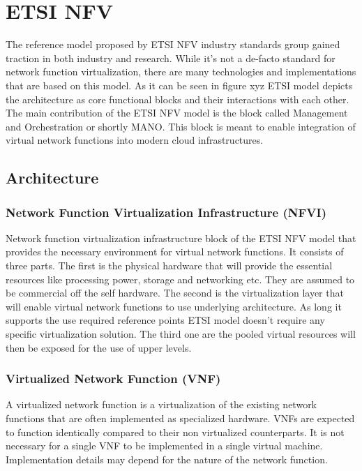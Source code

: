 \documentclass[12pt,oneandhalf,chaparabic,ceng,ms,eng,oneside,pntc]{gsufbe}
\begin{document}
\section{ETSI NFV}
The reference model proposed by ETSI NFV industry standards group gained traction in both industry and
research. While it's not a de-facto standard for network function virtualization, there are many
technologies and implementations that are based on this model. As it can be seen in figure xyz ETSI 
model depicts the architecture as core functional blocks and their interactions with each other. 
The main contribution of the ETSI NFV model is the block called Management and Orchestration or shortly
MANO. This block is meant to enable integration of virtual network functions into modern cloud
infrastructures.

\subsection{Architecture}
\subsubsection{Network Function Virtualization Infrastructure (NFVI)}
Network function virtualization infrastructure block of the ETSI NFV model that provides the necessary
environment for virtual network functions. It consists of three parts. The first is the physical hardware
that will provide the essential resources like processing power, storage and networking etc. They are
assumed to be commercial off the self hardware. The second is the virtualization layer that will enable
virtual network functions to use underlying architecture. As long it supports the use required reference
points ETSI model doesn't require any specific virtualization solution. The third one
are the pooled virtual resources will then be exposed for the use of upper levels.

\subsubsection{Virtualized Network Function (VNF)}
A virtualized network function is a virtualization of the existing network functions that are often
implemented as specialized hardware. VNFs are expected to function identically compared to their non 
virtualized counterparts. It is not necessary for a single VNF to be implemented in a single virtual
machine. Implementation details may depend for the nature of the network function.
\end{document}
